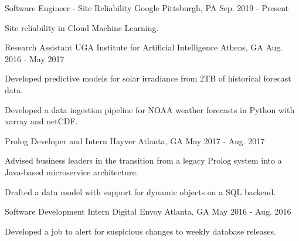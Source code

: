 \begin{cventries}

\cventry
{Software Engineer - Site Reliability}
{Google}
{Pittsburgh, PA}
{Sep. 2019 - Present}
{\begin{cvitems}
    \item {Site reliability in Cloud Machine Learning.}
\end{cvitems}}

\cventry
{Research Assistant}
{UGA Institute for Artificial Intelligence}
{Athens, GA}
{Aug. 2016 - May 2017}
{\begin{cvitems}
    \item {Developed predictive models for solar irradiance from 2TB of historical forecast data.}
    \item {Developed a data ingestion pipeline for NOAA weather forecasts in Python with xarray and netCDF.}
\end{cvitems}}

\cventry
{Prolog Developer and Intern}
{Hayver}
{Atlanta, GA}
{May 2017 - Aug. 2017}
{\begin{cvitems}
    \item {Advised business leaders in the transition from a legacy Prolog system into a Java-based microservice architecture.}
    \item {Drafted a data model with support for dynamic objects on a SQL backend.}
\end{cvitems}}

\cventry
{Software Development Intern}
{Digital Envoy}
{Atlanta, GA}
{May 2016 - Aug. 2016}
{\begin{cvitems}
    \item {Developed a job to alert for suspicious changes to weekly database releases.}
\end{cvitems}}

\end{cventries}
